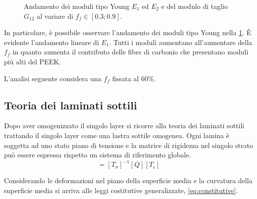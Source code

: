 \documentclass[a4paper,num-refs]{oup-contemporary}
\begin{document}
\begin{figure}
\def\svgwidth{\linewidth}
  
	\caption{Andamento dei moduli tipo Young $E_1$ ed $E_2$ e del modulo di taglio $G_{12}$ al variare di $f_f\in \left[0.3;0.9\right]$.}
		\label{fig:mixtureRule} 
\end{figure}

In particolare, è possibile osservare l'andamento dei moduli tipo Young nella \cref{fig:mixtureRule}. È evidente l'andamento lineare di $E_1$. Tutti i moduli aumentano all'aumentare della $f_f$ in quanto aumenta il contributo delle fibre di carbonio che presentano moduli più alti del PEEK. 

L'analisi seguente considera una $f_f$ fissata al 60\%. 




\subsection{Teoria dei laminati sottili }

Dopo aver omogenizzato il singolo layer si ricorre alla teoria dei laminati sottili \citep{SOTTILI} trattando il singolo layer come una lastra sottile omogenea. Ogni lamina è soggetta ad uno stato piano di tensione e la matrice di rigidezza nel singolo strato può essere espressa rispetto un sistema di riferimento globale. 
\begin{equation}
[\bar{Q}]=\left[T_{\sigma}\right]^{-1}[Q]\left[T_{\epsilon}\right]
\end{equation}

Considerando le deformazioni nel piano della superficie media e la curvatura della superficie media si arriva alle leggi costitutive generalizzate, \cref{eq:constitutive}.
\end{document}
